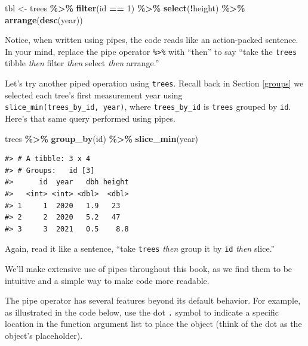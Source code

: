 \documentclass[
  11pt,
]{krantz}
\newenvironment{Shaded}{\begin{snugshade}}{\end{snugshade}}
\newcommand{\DecValTok}[1]{\textcolor[rgb]{0.00,0.00,0.81}{#1}}
\newcommand{\KeywordTok}[1]{\textcolor[rgb]{0.13,0.29,0.53}{\textbf{#1}}}
\newcommand{\NormalTok}[1]{#1}
\newcommand{\OperatorTok}[1]{\textcolor[rgb]{0.81,0.36,0.00}{\textbf{#1}}}
\newcommand{\StringTok}[1]{\textcolor[rgb]{0.31,0.60,0.02}{#1}}
\theoremstyle{definition}
\theoremstyle{definition}
\theoremstyle{definition}
\theoremstyle{definition}
\theoremstyle{remark}
\begin{document}
\begin{Shaded}
\begin{Highlighting}[]
\NormalTok{tbl \textless{}{-}}\StringTok{ }\NormalTok{trees }\OperatorTok{\%\textgreater{}\%}\StringTok{ }
\StringTok{  }\KeywordTok{filter}\NormalTok{(id }\OperatorTok{==}\StringTok{ }\DecValTok{1}\NormalTok{) }\OperatorTok{\%\textgreater{}\%}\StringTok{ }
\StringTok{  }\KeywordTok{select}\NormalTok{(}\OperatorTok{!}\NormalTok{height) }\OperatorTok{\%\textgreater{}\%}\StringTok{ }
\StringTok{  }\KeywordTok{arrange}\NormalTok{(}\KeywordTok{desc}\NormalTok{(year))}
\end{Highlighting}
\end{Shaded}

Notice, when written using pipes, the code reads like an action-packed sentence. In your mind, replace the pipe operator \texttt{\%\textgreater{}\%} with ``then'' to say ``take the \texttt{trees} tibble \emph{then} filter \emph{then} select \emph{then} arrange.''

Let's try another piped operation using \texttt{trees}. Recall back in Section \ref{groups} we selected each tree's first measurement year using \texttt{slice\_min(trees\_by\_id,\ year)}, where \texttt{trees\_by\_id} is \texttt{trees} grouped by \texttt{id}. Here's that same query performed using pipes.

\begin{Shaded}
\begin{Highlighting}[]
\NormalTok{trees }\OperatorTok{\%\textgreater{}\%}\StringTok{ }\KeywordTok{group\_by}\NormalTok{(id) }\OperatorTok{\%\textgreater{}\%}\StringTok{ }\KeywordTok{slice\_min}\NormalTok{(year)}
\end{Highlighting}
\end{Shaded}

\begin{verbatim}
#> # A tibble: 3 x 4
#> # Groups:   id [3]
#>      id  year   dbh height
#>   <int> <int> <dbl>  <dbl>
#> 1     1  2020   1.9   23  
#> 2     2  2020   5.2   47  
#> 3     3  2021   0.5    8.8
\end{verbatim}

Again, read it like a sentence, ``take \texttt{trees} \emph{then} group it by \texttt{id} \emph{then} slice.''

We'll make extensive use of pipes throughout this book, as we find them to be intuitive and a simple way to make code more readable.

The pipe operator has several features beyond its default behavior. For example, as illustrated in the code below, use the dot \texttt{.} symbol to indicate a specific location in the function argument list to place the object (think of the dot as the object's placeholder).
\end{document}
